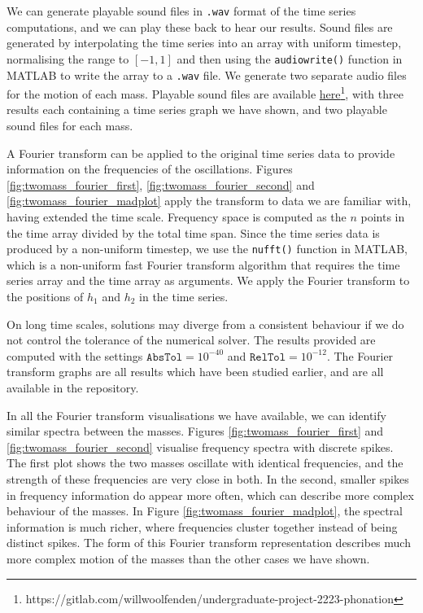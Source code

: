 \documentclass{report}
\begin{document}
We can generate playable sound files in \texttt{.wav} format of the time series computations,
and we can play these back to hear our results.
Sound files are generated by interpolating the time series into an array with uniform timestep,
normalising the range to $[-1,1]$
and then using the \texttt{audiowrite()} function in MATLAB to write the array to a \texttt{.wav} file.
We generate two separate audio files for the motion of each mass.
Playable sound files are available \hyperlink{https://gitlab.com/willwoolfenden/undergraduate-project-2223-phonation}{here}\footnote{https://gitlab.com/willwoolfenden/undergraduate-project-2223-phonation},
with three results each containing a time series graph we have shown,
and two playable sound files for each mass.

A Fourier transform can be applied to the original time series data to provide information on the frequencies of the oscillations.
Figures \ref{fig:twomass_fourier_first},
\ref{fig:twomass_fourier_second} and \ref{fig:twomass_fourier_madplot} apply the transform to data we are familiar with,
having extended the time scale.
Frequency space is computed as the $n$ points in the time array divided by the total time span.
Since the time series data is produced by a non-uniform timestep,
we use the \texttt{nufft()} function in MATLAB,
which is a non-uniform fast Fourier transform algorithm that requires the time series array and the time array as arguments.
We apply the Fourier transform to the positions of $h_1$ and $h_2$ in the time series.

On long time scales, solutions may diverge from a consistent behaviour if we do not control the tolerance of the numerical solver.
The results provided are computed with the settings $\mathtt{AbsTol}=10^{-40}$ and $\texttt{RelTol}=10^{-12}$.
The Fourier transform graphs are all results which have been studied earlier,
and are all available in the repository.

In all the Fourier transform visualisations we have available,
we can identify similar spectra between the masses.
Figures \ref{fig:twomass_fourier_first} and \ref{fig:twomass_fourier_second} visualise frequency spectra with discrete spikes.
The first plot shows the two masses oscillate with identical frequencies,
and the strength of these frequencies are very close in both.
In the second, smaller spikes in frequency information do appear more often,
which can describe more complex behaviour of the masses.
In Figure \ref{fig:twomass_fourier_madplot},
the spectral information is much richer,
where frequencies cluster together instead of being distinct spikes.
The form of this Fourier transform representation describes much more complex motion of the masses than the other cases we have shown.



\end{document}
